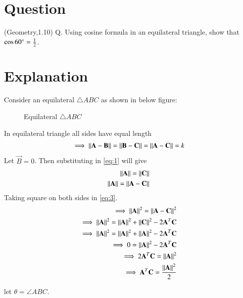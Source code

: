 \documentclass[journal,12pt,twocolumn]{IEEEtran}
\begin{document}
\section{\textbf{Question}}
(Geometry,1.10) Q. Using cosine formula in an equilateral triangle, show that $\cos60\degree=\frac{1}{2}$.
\section{\textbf{Explanation}}
Consider an equilateral $\triangle{ABC}$ as shown in below figure:
\renewcommand{\thefigure}{1}
\begin{figure}[!ht]
    \label{Fig:1}
    \centering
    \resizebox{7cm}{!}{}
    \caption{Equilateral $\triangle{ABC}$}
    \label{fig:tri_right_angle}
\end{figure}

In equilateral triangle all sides have equal length
\begin{align}
    \label{eq:1}\implies\left\lVert\mathbf{A-B}\right\rVert=\left\lVert\mathbf{B-C}\right\rVert=\left\lVert\mathbf{A-C}\right\rVert=k
\end{align}
Let $\vec{B}=0$. Then substituting in \eqref{eq:1} will give
\begin{align}
    \label{eq:2}\left\lVert\mathbf{A}\right\rVert=\left\lVert\mathbf{C}\right\rVert\\
    \label{eq:3}\left\lVert\mathbf{A}\right\rVert=\left\lVert\mathbf{A-C}\right\rVert
\end{align}
Taking square on both sides in \eqref{eq:3}.
\begin{align}
    \implies\left\lVert\mathbf{A}\right\rVert^2=\left\lVert\mathbf{A-C}\right\rVert^2\\
    \implies\left\lVert\mathbf{A}\right\rVert^2=\left\lVert\mathbf{A}\right\rVert^2+\left\lVert\mathbf{C}\right\rVert^2-2\mathbf{A}^T\mathbf{C}\\
    \implies\left\lVert\mathbf{A}\right\rVert^2=\left\lVert\mathbf{A}\right\rVert^2+\left\lVert\mathbf{A}\right\rVert^2-2\mathbf{A}^T\mathbf{C}\\
    \implies0=\left\lVert\mathbf{A}\right\rVert^2-2\mathbf{A}^T\mathbf{C}\\
    \implies2\mathbf{A}^T\mathbf{C}=\left\lVert\mathbf{A}\right\rVert^2\\
    \label{eq:9}\implies\mathbf{A}^T\mathbf{C}=\frac{\left\lVert\mathbf{A}\right\rVert^2}{2}
\end{align}

let $\theta=\angle ABC$.
\end{document}

